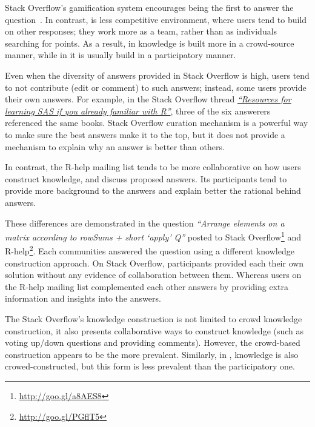 Stack Overflow's gamification system encourages being the first to answer the question~\cite{Singer2013}. In contrast, \RH is less competitive environment,
where users tend to build on other
responses; they work more as a team, rather than as individuals searching for points.
As 
a result, in \SO knowledge is built more in a crowd-source manner, while in \RH it is usually build in a participatory manner.

Even when the diversity of answers provided in Stack Overflow is high, users tend to not contribute (edit or comment) to such answers; instead, some users provide their own answers.
    For example, in the Stack Overflow thread \textit{\href{http://goo.gl/Mb4Pbk}{``Resources for learning SAS if you already familiar with R''}}, three of the six answerers referenced the same books.
    Stack Overflow curation mechanism is a powerful way to make sure the best answers make it to the top, but it does not provide a mechanism to explain why an
    answer is better than others.

    In contrast, the R-help mailing list tends to be more collaborative on how users construct knowledge, and discuss proposed answers. Its
    participants tend to provide more background to the answers and explain better the rational behind answers.

These differences are demonstrated in the question \textit{``Arrange elements on a matrix according to rowSums + short `apply' Q''}  posted to  Stack Overflow\footnote{\url{http://goo.gl/a8AES8}} and {R-help}\footnote{\url{http://goo.gl/PGflT5}}.
    Each communities answered the question using a different knowledge construction approach.
    On Stack Overflow, participants provided each their own solution without any evidence of collaboration between them.
    Whereas users on the R-help mailing list complemented each other answers by providing extra information and insights into the answers.
    
    The Stack Overflow's knowledge construction is not limited to crowd knowledge construction, it also presents collaborative ways to construct knowledge (such
    as voting up/down questions and providing comments).
    However, the crowd-based construction appears to be the more prevalent.
    Similarly, in \RH, knowledge is also crowed-constructed, but this form is less prevalent than the participatory one.

